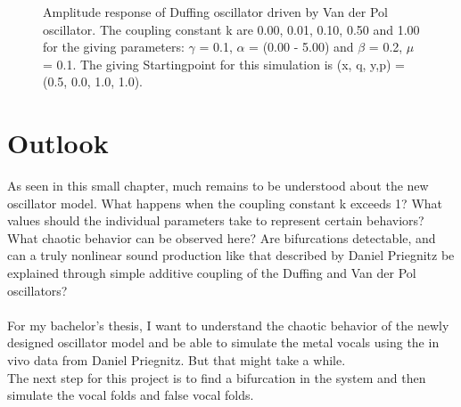 \documentclass[oneside,10pt,a4paper]{report}
\begin{document}
\begin{figure}[H]
		\caption{Amplitude response of Duffing oscillator driven by Van der Pol oscillator. The coupling constant k are 0.00, 0.01, 0.10, 0.50 and 1.00 for the giving parameters: $\gamma$ = 0.1, $\alpha$ = (0.00 - 5.00) and $\beta$ = 0.2, $\mu$ = 0.1. The giving Startingpoint for this simulation is (x, q, y,p) = (0.5, 0.0, 1.0, 1.0).}
		\label{fig:resonanz}
	\end{figure}
		
		
	\chapter{Outlook}	
		As seen in this small chapter, much remains to be understood about the new oscillator model. What happens when the coupling constant k exceeds 1? What values should the individual parameters take to represent certain behaviors? What chaotic behavior can be observed here? Are bifurcations detectable, and can a truly nonlinear sound production like that described by Daniel Priegnitz be explained through simple additive coupling of the Duffing and Van der Pol oscillators?\\
		 \\
		For my bachelor's thesis, I want to understand the chaotic behavior of the newly designed oscillator model and be able to simulate the metal vocals using the in vivo data from Daniel Priegnitz. But that might take a while. \\
		The next step for this project is to find a bifurcation in the system and then simulate the vocal folds and false vocal folds.
	
	\nocite{*}
	
	\newpage
\end{document}
